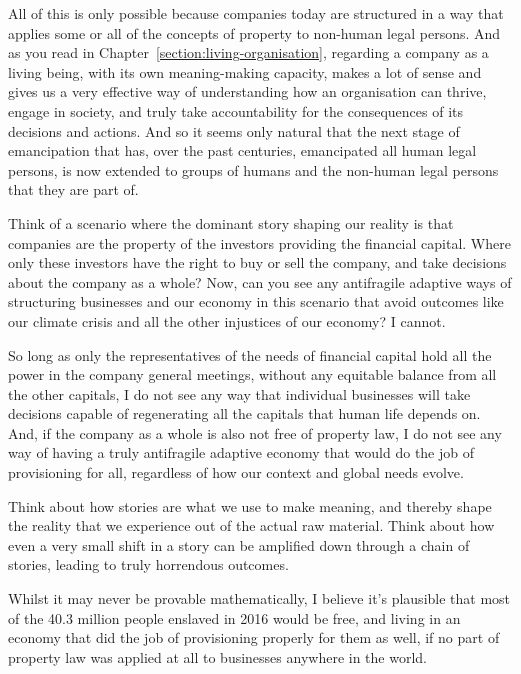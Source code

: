 All of this is only possible because companies today are structured in a way that applies some or all of the concepts of property to non-human legal persons. And as you read in Chapter~\ref{section:living-organisation}, regarding a company as a living being, with its own meaning\hyp{}making capacity, makes a lot of sense and gives us a very effective way of understanding how an organisation can thrive, engage in society, and truly take accountability for the consequences of its decisions and actions. And so it seems only natural that the next stage of emancipation that has, over the past centuries, emancipated all human legal persons, is now extended to groups of humans and the non-human legal persons that they are part of.


Think of a scenario where the dominant story shaping our reality is that companies are the property of the investors providing the financial capital. Where only these investors have the right to buy or sell the company, and take decisions about the company as a whole? Now, can you see any antifragile\cite{taleb-antifragile} adaptive ways of structuring businesses and our economy in this scenario that avoid outcomes like our climate crisis and all the other injustices of our economy? I cannot.


So long as only the representatives of the needs of financial capital hold all the power in the company general meetings, without any equitable balance from all the other capitals, I do not see any way that individual businesses will take decisions capable of regenerating all the capitals that human life depends on. And, if the company as a whole is also not free of property law, I do not see any way of having a truly antifragile adaptive economy that would do the job of provisioning for all, regardless of how our context and global needs evolve.


Think about how stories are what we use to make meaning, and thereby shape the reality that we experience out of the actual raw material. Think about how even a very small shift in a story can be amplified down through a chain of stories, leading to truly horrendous outcomes.


Whilst it may never be provable mathematically, I believe it's plausible that most of the 40.3 million people enslaved in 2016 would be free, and living in an economy that did the job of provisioning properly for them as well, if no part of property law was applied at all to businesses anywhere in the world. 


